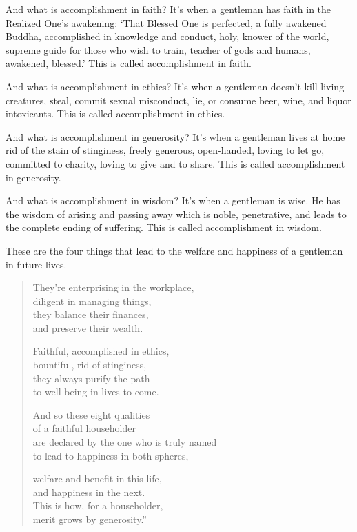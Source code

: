 \documentclass[12pt,openany]{book}%
\begin{document}
And what is accomplishment in faith? It’s when a gentleman has faith in the Realized One’s awakening: ‘That Blessed One is perfected, a fully awakened Buddha, accomplished in knowledge and conduct, holy, knower of the world, supreme guide for those who wish to train, teacher of gods and humans, awakened, blessed.’ This is called accomplishment in faith. 

And what is accomplishment in ethics? It’s when a gentleman doesn’t kill living creatures, steal, commit sexual misconduct, lie, or consume beer, wine, and liquor intoxicants. This is called accomplishment in ethics. 

And what is accomplishment in generosity? It’s when a gentleman lives at home rid of the stain of stinginess, freely generous, open-handed, loving to let go, committed to charity, loving to give and to share. This is called accomplishment in generosity. 

And what is accomplishment in wisdom? It’s when a gentleman is wise. He has the wisdom of arising and passing away which is noble, penetrative, and leads to the complete ending of suffering. This is called accomplishment in wisdom. 

These are the four things that lead to the welfare and happiness of a gentleman in future lives. 

\begin{verse}%
They’re enterprising in the workplace, \\
diligent in managing things, \\
they balance their finances, \\
and preserve their wealth. 

Faithful, accomplished in ethics, \\
bountiful, rid of stinginess, \\
they always purify the path \\
to well-being in lives to come. 

And so these eight qualities \\
of a faithful householder \\
are declared by the one who is truly named \\
to lead to happiness in both spheres, 

welfare and benefit in this life, \\
and happiness in the next. \\
This is how, for a householder, \\
merit grows by generosity.” 

%
\end{verse}
\end{document}
